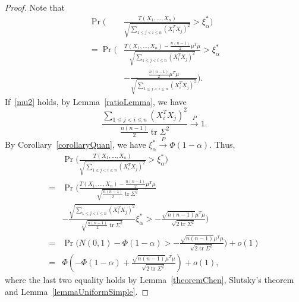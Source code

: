 \documentclass[smallcondensed,final,natbib]{svjour3}          %
\DeclareMathOperator{\mytr}{tr}
\begin{document}
\begin{proof} 
    Note that
    \begin{align}
        \Pr\Big(&\frac{T( X_1,\ldots, X_n)}{\sqrt{\sum_{1\leq j<i\leq n}{(X_i^T X_j)}^2}}>\xi_{\alpha}^* \Big)\nonumber\\
            =
            \Pr\bigg(&\frac{T( X_1,\ldots, X_n)-\frac{n(n-1)}{2}\mu^T\mu}{\sqrt{\sum_{1\leq j<i\leq n}{(X_i^T X_j)}^2}}>\xi_{\alpha}^*\nonumber\\
            &
            -\frac{\frac{n(n-1)}{2}\mu^T\mu}{\sqrt{\sum_{1\leq j<i\leq n}{(X_i^T X_j)}^2}} \bigg).\nonumber
    \end{align}
    If~\eqref{mu2} holds, by Lemma~\ref{ratioLemma}, we have
    \begin{equation*}
    \frac{\sum_{1\leq j< i\leq n}(X_i^T X_j)^2}{\frac{n(n-1)}{2}\mytr \Sigma^2}\xrightarrow{P}1.
    \end{equation*}
    By Corollary~\ref{corollaryQuan}, we have $\xi_{\alpha}^*\xrightarrow{P} \Phi(1-\alpha)$.
Thus,
    \begin{equation*}
        \begin{aligned}
            &\Pr\Big(\frac{T( X_1,\ldots, X_n)}{\sqrt{\sum_{1\leq j<i\leq n}{(X_i^T X_j)}^2}}>\xi_{\alpha}^* \Big)\\
            =&
            \Pr\Big(\frac{T( X_1,\ldots, X_n)-\frac{n(n-1)}{2}\mu^T\mu}{\sqrt{\frac{n(n-1)}{2}\mytr \Sigma^2}}\\
            &-
            \frac{\sqrt{\sum_{1\leq j<i\leq n}{(X_i^T X_j)}^2}}{\sqrt{\frac{n(n-1)}{2}\mytr \Sigma^2}}\xi_{\alpha}^*>
            -\frac{\sqrt{n(n-1)}\mu^T\mu}{\sqrt{2\mytr \Sigma^2}} \Big)\\
            =&
            \Pr\Big(N(0,1)-\Phi(1-\alpha)>-\frac{\sqrt{n(n-1)}\mu^T\mu}{\sqrt{2\mytr \Sigma^2}}\Big)+o(1)\\
            =&
            \Phi(-\Phi(1-\alpha)+\frac{\sqrt{n(n-1)}\mu^T\mu}{\sqrt{2\mytr \Sigma^2}})+o(1),
        \end{aligned}
    \end{equation*}
    where the last two equality holds by Lemma~\ref{theoremChen}, Slutsky's theorem and Lemma~\ref{lemmaUniformSimple}.


\end{proof}
\end{document}
